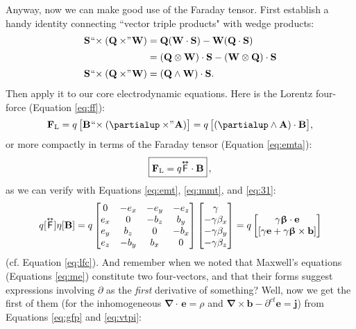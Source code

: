 \documentclass[12pt]{article}
\renewcommand{\vv}[1]{\mathbf{#1}}
\newcommand{\vvbeta}{\bm{\upbeta}}
\newcommand{\del}{\boldsymbol{\nabla}}
\newcommand{\capdy}[1]{ \overset{ \text{\tiny$\bm\leftrightarrow$} }{\vphantom{\text{\small{A}}}\smash{#1}} }
\begin{document}
Anyway, now we can make good use of the Faraday tensor. First establish a handy identity connecting ``vector triple products" with wedge products:
\begin{equation}\label{eq:vtpi}
\begin{split}
\vv S \mkern1mu `` \mkern-4mu \times (\vv Q \times \mkern-4mu " \mkern1mu \vv W) &= \vv Q ( \vv W \cdot \vv S) - \vv W ( \vv Q \cdot \vv S)  \\[2pt]
&= ( \vv Q \otimes \vv W ) \cdot \vv S - ( \vv W \otimes \vv Q ) \cdot \vv S \\[2pt]
\vv S \mkern1mu `` \mkern-4mu \times (\vv Q \times \mkern-4mu " \mkern1mu \vv W) &= ( \vv Q \wedge \vv W ) \cdot \vv S .
\end{split}
\end{equation}
Then apply it to our core electrodynamic equations. Here is the Lorentz four-force (Equation \ref{eq:ff}):
\begin{equation*}
\vv F_{\textrm{L}} = q \, \bigl[ \vv B \mkern1mu `` \mkern-4mu \times (\partialup \times \mkern-4mu " \mkern1mu \vv A) \bigr] = q \, \bigl[ (\partialup \wedge \vv A) \cdot \vv B \bigr] ,
\end{equation*}
or more compactly in terms of the Faraday tensor (Equation \ref{eq:emta}):
\begin{equation}\label{eq:lfffd}
\boxed{ \vphantom{A_{A_A}} \vv F_{\mathrm{L}} = q \capdy{\mathsf{F}} \cdot \vv B } \, ,
\end{equation}
as we can verify with Equations \ref{eq:emt}, \ref{eq:mmt}, and \ref{eq:31}:
\begin{equation*}
q [\capdy{\mathsf{F}}] \eta [\vv B]
=
q
\begin{bmatrix}
0 & -e_x & -e_y & -e_z \\
e_x & 0 & -b_z & b_y \\
e_y & b_z & 0 & -b_x \\
e_z & -b_y & b_x & 0
\end{bmatrix}
\begin{bmatrix}
\gamma \\
- \gamma \beta_x \\
- \gamma \beta_y \\
- \gamma \beta_z
\end{bmatrix}
=
q
\begin{bmatrix}
\gamma \vvbeta \cdot \vv e \\
[ \gamma \vv e + \gamma \vvbeta \times \vv b ]
\end{bmatrix}
\end{equation*}
(cf. Equation \ref{eq:lfc}). And remember when we noted that Maxwell's equations (Equations \ref{eq:me}) constitute two four-vectors, and that their forms suggest expressions involving $\partialup$ as the \emph{first} derivative of something? Well, now we get the first of them (for the inhomogeneous $\del \cdot \, \vv e = \rho$ and ${ \del \times \vv b - \partial^{ct} \vv e = \vv j }$) from Equations \ref{eq:gfp} and \ref{eq:vtpi}:
\end{document}
